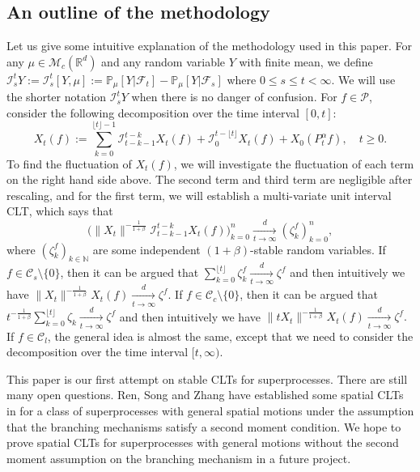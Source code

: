 \documentclass[EJP]{ejpecp} %
\begin{document}
\subsection{An outline of the methodology}
	Let us give some intuitive explanation of the methodology used in this paper.
	For any $\mu\in \mathcal M_c(\mathbb R^d)$ and any random variable $Y$ with finite mean, we define $\mathcal I_s^t Y:= \mathcal I_s^t [Y, \mu] := \mathbb P_\mu[Y|\mathscr F_t] - \mathbb P_\mu[Y|\mathscr F_s]$ where $0 \leq s \leq t <\infty.$
	We will use the shorter notation $\mathcal I_s^t Y$ when there is no danger of confusion.
	For $f\in \mathcal{P}$, consider the following decomposition over the time interval $[0,t]$:
\[
	X_t(f)
	:= \sum_{k=0}^{\lfloor t \rfloor-1} \mathcal I_{t-k-1}^{t-k} X_t (f)+\mathcal I_0^{t-\lfloor t \rfloor} X_t(f) + X_0( P^\alpha_tf),
	\quad t\geq 0.
\]
	To find the fluctuation of $X_t(f)$, we will investigate the fluctuation of each term on the right hand side above.
    The second term and third term are negligible after rescaling,
	and for the first term, we will establish a multi-variate unit interval CLT,  which says that
\[
  	\Big( \|X_t\|^{-\frac{1}{1+\beta}}\mathcal I^{t-k}_{t-k-1} X_t(f) \Big)_{k=0}^n
  	\xrightarrow [t\to \infty]{d} (\zeta^f_k)_{k=0}^n,
\]
	where $(\zeta^f_k)_{k \in \mathbb N}$
	are some independent
	$(1+\beta)$-stable random variables.
	If $f \in \mathcal C_s\setminus\{0\}$, then it can be argued that $\sum_{k=0}^{\lfloor t \rfloor} \zeta^f_k \xrightarrow[t\to \infty]{d} \zeta^f$ and then intuitively we have $\|X_t\|^{-\frac{1}{1+\beta}}  X_t(f) \xrightarrow[t\to \infty]{d} \zeta^f.$
	If $f \in \mathcal C_c \setminus \{0\}$, then it can be argued that $ t^{-\frac{1}{1+\beta}} \sum_{k=0}^{\lfloor t\rfloor} \zeta_k \xrightarrow[t\to \infty]{ d} \zeta^f$ and then intuitively we have $\|tX_t\|^{-\frac{1}{1+\beta}}  X_t(f) \xrightarrow[t\to \infty]{d} \zeta^f.$
	If $f\in \mathcal C_l$, the general idea is almost the same, except that we need to consider the decomposition over the time interval $[t,\infty)$.

	This paper is our first attempt on stable CLTs for superprocesses.
	There are still many open questions.
	Ren, Song and Zhang have established some spatial  CLTs in \cite{RenSongZhang2015Central} for a class of superprocesses with general spatial motions under the assumption that the branching mechanisms satisfy a second moment condition.
	We hope to prove spatial CLTs for superprocesses with general motions without the second moment assumption on the branching mechanism in a future project.
\end{document}
